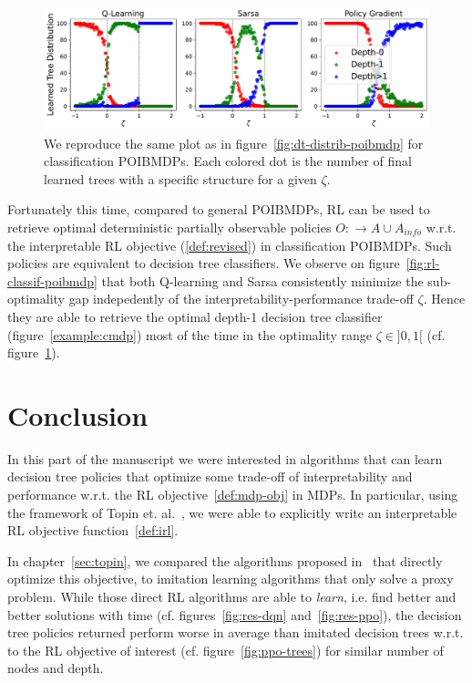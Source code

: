 \begin{figure}
    \centering
    \includegraphics[width=1\textwidth]{images/images_part1/tree_distributions_classif.pdf}
    \caption{We reproduce the same plot as in figure~\ref{fig:dt-distrib-poibmdp} for classification POIBMDPs. Each colored dot is the number of final learned trees with a specific structure for a given $\zeta$.}\label{fig:tree-distrib-classif-poibmdp}
\end{figure}

Fortunately this time, compared to general POIBMDPs, RL can be used to retrieve optimal deterministic partially observable policies $O:\rightarrow A\cup A_{info}$ w.r.t. the interpretable RL objective (\ref{def:revised}) in classification POIBMDPs.
Such policies are equivalent to decision tree classifiers.
We observe on figure~\ref{fig:rl-classif-poibmdp} that both Q-learning and Sarsa consistently minimize the sub-optimality gap indepedently of the interpretability-performance trade-off $\zeta$. 
Hence they are able to retrieve the optimal depth-1 decision tree classifier (figure~\ref{example:cmdp}) most of the time in the optimality range $\zeta\in ]0, 1[$ (cf. figure~\ref{fig:tree-distrib-classif-poibmdp}).


\section{Conclusion}\label{sec:ccl-pomdp}
In this part of the manuscript we were interested in algorithms that can learn decision tree policies that optimize some trade-off of interpretability and performance w.r.t. the RL objective~\ref{def:mdp-obj} in MDPs.
In particular, using the framework of Topin et. al.~\cite{topin2021iterative}, we were able to explicitly write an interpretable RL objective function~\ref{def:irl}.

In chapter~\ref{sec:topin}, we compared the algorithms proposed in~\cite{topin2021iterative} that directly optimize this objective, to imitation learning algorithms that only solve a proxy problem.
While those direct RL algorithms are able to \textit{learn}, i.e. find better and better solutions with time (cf. figures~\ref{fig:res-dqn} and~\ref{fig:res-ppo}), the decision tree policies returned perform worse in average than imitated decision trees w.r.t. to the RL objective of interest (cf. figure~\ref{fig:ppo-trees}) for similar number of nodes and depth.

